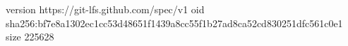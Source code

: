 version https://git-lfs.github.com/spec/v1
oid sha256:bf7e8a1302ec1cc53d48651f1439a8cc55f1b27ad8ca52cd830251dfc561c0e1
size 225628
